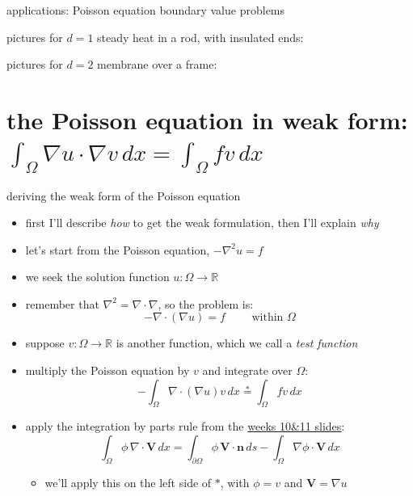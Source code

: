 \documentclass[10pt,
               svgnames,
               hyperref={colorlinks,
                         citecolor=DeepPink4,
                         linkcolor=FireBrick,
                         urlcolor=blue},
               usepdftitle=false]{beamer}
\newcommand{\bn}{\mathbf{n}}
\newcommand{\bV}{\mathbf{V}}
\newcommand{\RR}{\mathbb{R}}
\newcommand{\Div}{\nabla\cdot}
\newcommand{\grad}{\nabla}
\newcommand{\ds}{\displaystyle}
\begin{document}
\begin{frame}{applications: Poisson equation boundary value problems}

\noindent pictures for $d=1$ steady heat in a rod, with insulated ends:

\vspace{30mm}
\noindent pictures for $d=2$ membrane over a frame:

\vspace{35mm}
\end{frame}


\AtBeginSection[] {
    \begin{frame}{Outline}
    \setbeamertemplate{section in toc}[sections numbered]
    \tableofcontents[currentsection]%
    \end{frame}
}

\section{the Poisson equation in weak form: $\ds \int_\Omega \grad u \cdot \grad v\,dx = \int_\Omega f v\,dx$}

\begin{frame}{deriving the weak form of the Poisson equation}

\begin{itemize}
\item first I'll describe \emph{how} to get the weak formulation, then I'll explain \emph{why}
\item let's start from the Poisson equation, $-\grad^2 u=f$
\item we seek the solution function $u:\Omega\to\RR$
\item remember that $\grad^2=\Div\grad$, so the problem is:
    $$- \Div(\grad u) = f \qquad \text{ within } \Omega$$
\item suppose $v:\Omega\to\RR$ is another function, which we call a \emph{test function}
\item multiply the Poisson equation by $v$ and integrate over $\Omega$:
    $$- \int_\Omega \Div(\grad u) v\,dx \stackrel{\ast}{=} \int_\Omega f v\,dx$$
\item apply the integration by parts rule from the \href{https://bueler.github.io/fa/assets/slides/S26/week10.pdf}{weeks 10\&11 slides}:
    $$\int_\Omega \phi\,\Div \bV\,dx = \int_{\partial\Omega} \phi\,\bV\cdot \bn\,ds - \int_\Omega \grad \phi\cdot \bV\,dx$$

   \begin{itemize}
   \item[$\circ$] we'll apply this on the left side of $\ast$, with $\phi=v$ and $\bV=\grad u$
   \end{itemize}
\end{itemize}
\end{frame}
\end{document}
